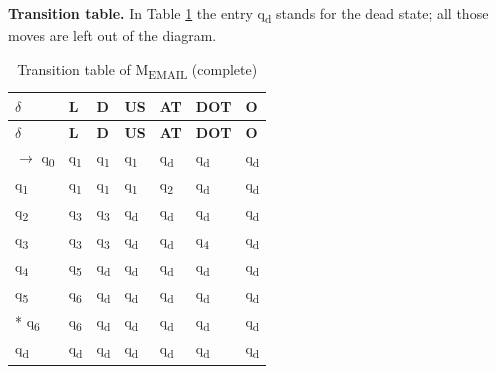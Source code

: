 \documentclass[12pt,a4paper]{article}
\begin{document}
\textbf{Transition table.} In Table \ref{tab:em_delta} the entry q\textsubscript{d} stands for the dead state; all those moves are left out of the diagram.

{\small
\begin{longtable}{|>{\raggedright\arraybackslash}p{}|>{\centering\arraybackslash}p{}|>{\centering\arraybackslash}p{}|>{\centering\arraybackslash}p{}|>{\centering\arraybackslash}p{}|>{\centering\arraybackslash}p{}|>{\centering\arraybackslash}p{}|}
\caption[Transition table of MEMAIL (complete)]{Transition table of M\textsubscript{EMAIL} (complete)}\label{tab:em_delta}\\
\hline
\rowcolor{hdr}\textbf{\ensuremath{\delta}} & \textbf{L} & \textbf{D} & \textbf{US} & \textbf{AT} & \textbf{DOT} & \textbf{O}\\ \hline
\endfirsthead
\hline
\rowcolor{hdr}\textbf{\ensuremath{\delta}} & \textbf{L} & \textbf{D} & \textbf{US} & \textbf{AT} & \textbf{DOT} & \textbf{O}\\ \hline
\endhead
\ensuremath{\rightarrow} q\textsubscript{0} & q\textsubscript{1} & q\textsubscript{1} & q\textsubscript{1} & q\textsubscript{d} & q\textsubscript{d} & q\textsubscript{d}\\ \hline
q\textsubscript{1} & q\textsubscript{1} & q\textsubscript{1} & q\textsubscript{1} & q\textsubscript{2} & q\textsubscript{d} & q\textsubscript{d}\\ \hline
q\textsubscript{2} & q\textsubscript{3} & q\textsubscript{3} & q\textsubscript{d} & q\textsubscript{d} & q\textsubscript{d} & q\textsubscript{d}\\ \hline
q\textsubscript{3} & q\textsubscript{3} & q\textsubscript{3} & q\textsubscript{d} & q\textsubscript{d} & q\textsubscript{4} & q\textsubscript{d}\\ \hline
q\textsubscript{4} & q\textsubscript{5} & q\textsubscript{d} & q\textsubscript{d} & q\textsubscript{d} & q\textsubscript{d} & q\textsubscript{d}\\ \hline
q\textsubscript{5} & q\textsubscript{6} & q\textsubscript{d} & q\textsubscript{d} & q\textsubscript{d} & q\textsubscript{d} & q\textsubscript{d}\\ \hline
* q\textsubscript{6} & q\textsubscript{6} & q\textsubscript{d} & q\textsubscript{d} & q\textsubscript{d} & q\textsubscript{d} & q\textsubscript{d}\\ \hline
q\textsubscript{d} & q\textsubscript{d} & q\textsubscript{d} & q\textsubscript{d} & q\textsubscript{d} & q\textsubscript{d} & q\textsubscript{d}\\ \hline
\end{longtable}}
\end{document}
